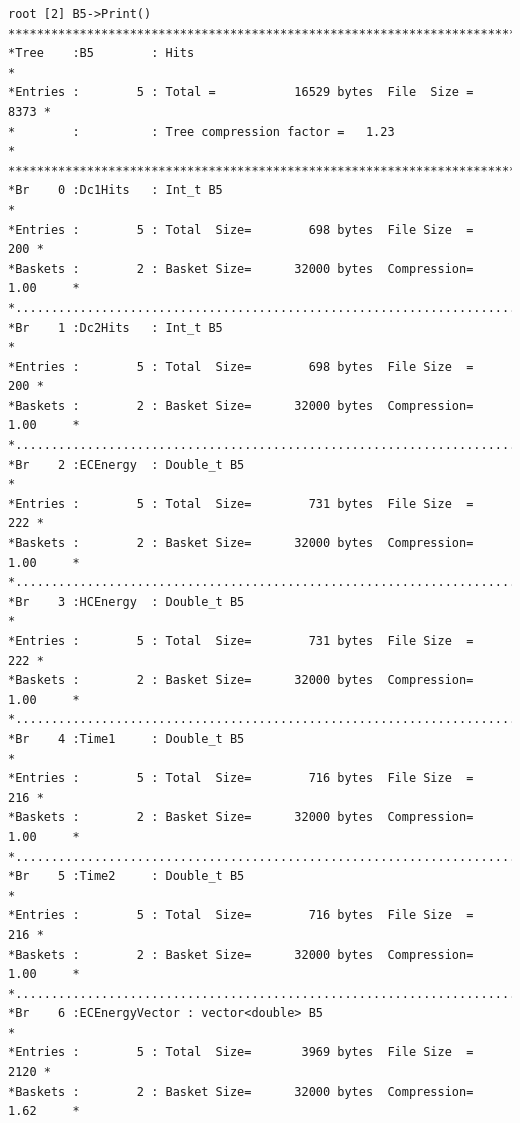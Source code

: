 \documentclass[a4paper,11pt,twoside]{article}
\begin{document}
\begin{lstlisting}
root [2] B5->Print()
******************************************************************************
*Tree    :B5        : Hits                                                   *
*Entries :        5 : Total =           16529 bytes  File  Size =       8373 *
*        :          : Tree compression factor =   1.23                       *
******************************************************************************
*Br    0 :Dc1Hits   : Int_t B5                                               *
*Entries :        5 : Total  Size=        698 bytes  File Size  =        200 *
*Baskets :        2 : Basket Size=      32000 bytes  Compression=   1.00     *
*............................................................................*
*Br    1 :Dc2Hits   : Int_t B5                                               *
*Entries :        5 : Total  Size=        698 bytes  File Size  =        200 *
*Baskets :        2 : Basket Size=      32000 bytes  Compression=   1.00     *
*............................................................................*
*Br    2 :ECEnergy  : Double_t B5                                            *
*Entries :        5 : Total  Size=        731 bytes  File Size  =        222 *
*Baskets :        2 : Basket Size=      32000 bytes  Compression=   1.00     *
*............................................................................*
*Br    3 :HCEnergy  : Double_t B5                                            *
*Entries :        5 : Total  Size=        731 bytes  File Size  =        222 *
*Baskets :        2 : Basket Size=      32000 bytes  Compression=   1.00     *
*............................................................................*
*Br    4 :Time1     : Double_t B5                                            *
*Entries :        5 : Total  Size=        716 bytes  File Size  =        216 *
*Baskets :        2 : Basket Size=      32000 bytes  Compression=   1.00     *
*............................................................................*
*Br    5 :Time2     : Double_t B5                                            *
*Entries :        5 : Total  Size=        716 bytes  File Size  =        216 *
*Baskets :        2 : Basket Size=      32000 bytes  Compression=   1.00     *
*............................................................................*
*Br    6 :ECEnergyVector : vector<double> B5                                 *
*Entries :        5 : Total  Size=       3969 bytes  File Size  =       2120 *
*Baskets :        2 : Basket Size=      32000 bytes  Compression=   1.62     *

\end{lstlisting}
\end{document}
